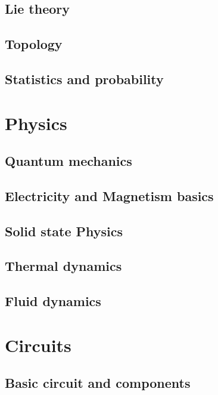 \documentclass{article}
\begin{document}
\subsection{Lie theory}

\subsection{Topology}

\subsection{Statistics and probability}

\newpage %

\section{Physics}

\subsection{Quantum mechanics}

\subsection{Electricity and Magnetism basics}

\subsection{Solid state Physics}

\subsection{Thermal dynamics}

\subsection{Fluid dynamics}

\section{Circuits}

\subsection{Basic circuit and components}
\end{document}
